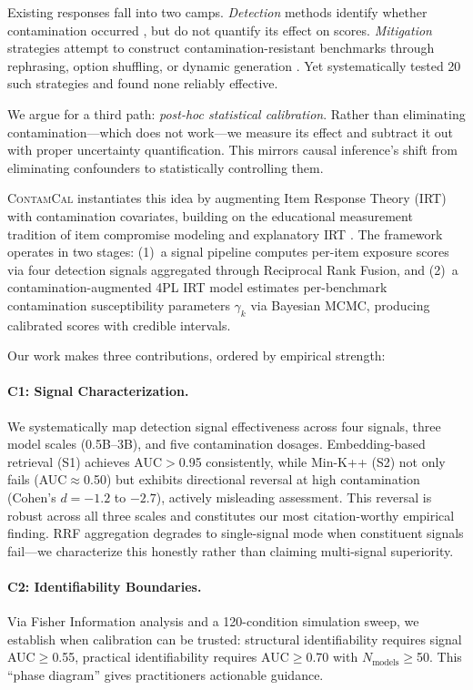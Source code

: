 \documentclass[11pt,a4paper]{article}
\newcommand{\contamcal}{\textsc{ContamCal}}
\begin{document}
Existing responses fall into two camps.
\emph{Detection} methods identify whether contamination occurred \citep{shi2024detecting,yang2023rethinking,golchin2024time,oren2024proving}, but do not quantify its effect on scores.
\emph{Mitigation} strategies attempt to construct contamination-resistant benchmarks through rephrasing, option shuffling, or dynamic generation \citep{white2024livebench,li2024task}. Yet \citet{zhang2025emperor} systematically tested 20 such strategies and found none reliably effective.

We argue for a third path: \emph{post-hoc statistical calibration}.
Rather than eliminating contamination---which does not work---we measure its effect and subtract it out with proper uncertainty quantification.
This mirrors causal inference's shift from eliminating confounders to statistically controlling them.

\contamcal{} instantiates this idea by augmenting Item Response Theory (IRT) with contamination covariates, building on the educational measurement tradition of item compromise modeling \citep{eckerly2017detecting,sinharay2017assessment} and explanatory IRT \citep{deboeck2004explanatory}.
The framework operates in two stages: (1)~a signal pipeline computes per-item exposure scores via four detection signals aggregated through Reciprocal Rank Fusion, and (2)~a contamination-augmented 4PL IRT model estimates per-benchmark contamination susceptibility parameters $\gamma_k$ via Bayesian MCMC, producing calibrated scores with credible intervals.

Our work makes three contributions, ordered by empirical strength:

\paragraph{C1: Signal Characterization.}
We systematically map detection signal effectiveness across four signals, three model scales (0.5B--3B), and five contamination dosages.
Embedding-based retrieval (S1) achieves AUC$>$0.95 consistently, while Min-K++ (S2) not only fails (AUC$\approx$0.50) but exhibits directional reversal at high contamination (Cohen's $d = -1.2$ to $-2.7$), actively misleading assessment.
This reversal is robust across all three scales and constitutes our most citation-worthy empirical finding.
RRF aggregation degrades to single-signal mode when constituent signals fail---we characterize this honestly rather than claiming multi-signal superiority.

\paragraph{C2: Identifiability Boundaries.}
Via Fisher Information analysis and a 120-condition simulation sweep, we establish when calibration can be trusted: structural identifiability requires signal AUC$\geq$0.55, practical identifiability requires AUC$\geq$0.70 with $N_\text{models}\geq$50.
This ``phase diagram'' gives practitioners actionable guidance.
\end{document}
